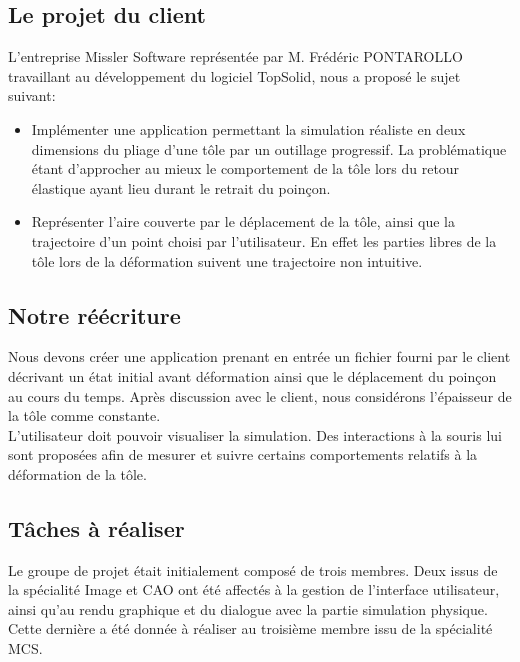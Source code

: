 \documentclass[a4paper, 11pt]{article}
\begin{document}
\subsection{Le projet du client}
L'entreprise Missler Software  représentée par M. Frédéric PONTAROLLO travaillant au développement du logiciel TopSolid, nous a proposé le sujet suivant:
\begin{itemize}
        \renewcommand{\labelitemi}{$\bullet$}
    \item Implémenter une application permettant la simulation réaliste en deux dimensions du pliage d'une tôle par un outillage progressif.
        La problématique étant d'approcher au mieux le comportement de la tôle lors du retour élastique ayant lieu durant le retrait du poinçon.
    \item Représenter l'aire couverte par le déplacement de la tôle, ainsi que la trajectoire d'un point choisi par l'utilisateur.
        En effet les parties libres de la tôle lors de la déformation suivent une trajectoire non intuitive.
\end{itemize}

\subsection{Notre réécriture}
Nous devons créer une application prenant en entrée un fichier fourni par le client décrivant un état initial avant déformation ainsi que le déplacement du poinçon au cours du temps. Après discussion avec le client, nous considérons l'épaisseur de la tôle comme constante.\\
L'utilisateur doit pouvoir visualiser la simulation. Des interactions à la souris lui sont proposées afin de mesurer et suivre certains comportements relatifs à la déformation de la tôle.

\subsection{Tâches à réaliser}
Le groupe de projet était initialement composé de trois membres.
Deux issus de la spécialité Image et CAO ont été affectés à la gestion de l'interface utilisateur, ainsi qu'au rendu graphique et du dialogue avec la partie simulation physique.
Cette dernière a été donnée à réaliser au troisième membre issu de la spécialité MCS.
\end{document}
